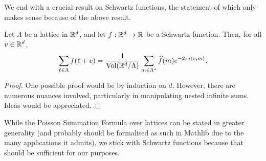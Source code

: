 We end with a crucial result on Schwartz functions, the statement of which only makes sense because of the above result.
\begin{theorem}\label{thm:Poisson-summation-formula}
  Let $\Lambda$ be a lattice in $\mathbb{R}^d$, and let $f:\mathbb{R}^d\to\mathbb{R}$ be a Schwartz function. Then, for all $v \in \mathbb{R}^d$,
  \[
    \sum_{\ell\in\Lambda}f(\ell + v) = \frac{1}{\operatorname{Vol}\!\left(\mathbb{R}^d/\Lambda\right)} \sum_{m\in\Lambda^*}\widehat{f}(m) e^{-2\pi i \left\langle v, m \right\rangle}.
  \]
\end{theorem}
\begin{proof}
  One possible proof would be by induction on $d$. However, there are numerous nuances involved, particularly in manipulating nested infinite sums. Ideas would be appreciated.
\end{proof}

While the Poisson Summation Formula over lattices can be stated in greater generality (and probably should be formalised as such in Mathlib due to the many applications it admits), we stick with Schwartz functions because that should be sufficient for our purposes.
